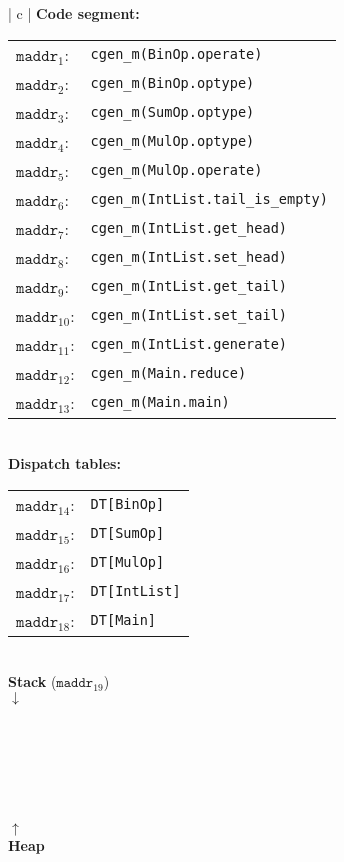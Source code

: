 \documentclass[11pt]{article}
\begin{document}
\begin{enumerate}
  \begin{tabular}{ | c | }
  \hline
  \textbf{Code segment:} \\
  \begin{tabular}{ | R{2cm} | L{9cm} |}
  \hline
  $\mathtt{maddr}_1$: & \texttt{cgen\_m(BinOp.operate)} \\
  $\mathtt{maddr}_2$: & \texttt{cgen\_m(BinOp.optype)} \\
  $\mathtt{maddr}_3$: & \texttt{cgen\_m(SumOp.optype)} \\
  $\mathtt{maddr}_4$: & \texttt{cgen\_m(MulOp.optype)} \\
  $\mathtt{maddr}_5$: & \texttt{cgen\_m(MulOp.operate)} \\
  $\mathtt{maddr}_6$: & \texttt{cgen\_m(IntList.tail\_is\_empty)} \\
  $\mathtt{maddr}_7$: & \texttt{cgen\_m(IntList.get\_head)} \\
  $\mathtt{maddr}_8$: & \texttt{cgen\_m(IntList.set\_head)} \\
  $\mathtt{maddr}_9$: & \texttt{cgen\_m(IntList.get\_tail)} \\
  $\mathtt{maddr}_{10}$: & \texttt{cgen\_m(IntList.set\_tail)} \\
  $\mathtt{maddr}_{11}$: & \texttt{cgen\_m(IntList.generate)} \\
  $\mathtt{maddr}_{12}$: & \texttt{cgen\_m(Main.reduce)} \\
  $\mathtt{maddr}_{13}$: & \texttt{cgen\_m(Main.main)} \\
  \hline
  \end{tabular} \\
  \textbf{Dispatch tables:} \\
  \begin{tabular}{ | R{2cm} | L{9cm} |}
  \hline
  $\mathtt{maddr}_{14}$: & \texttt{DT[BinOp]} \\
  $\mathtt{maddr}_{15}$: & \texttt{DT[SumOp]} \\
  $\mathtt{maddr}_{16}$: & \texttt{DT[MulOp]} \\
  $\mathtt{maddr}_{17}$: & \texttt{DT[IntList]} \\
  $\mathtt{maddr}_{18}$: & \texttt{DT[Main]} \\
  \hline
  \end{tabular} \\
  \textbf{Stack} ($\mathtt{maddr}_{19}$) \\
  $\downarrow$ \\
  \\
  \\
  \\
  \hline
  \\
  \\
  \\
  $\uparrow$ \\
  \textbf{Heap} \\
  \hline
  \end{tabular}
  

\end{enumerate}
\end{document}
